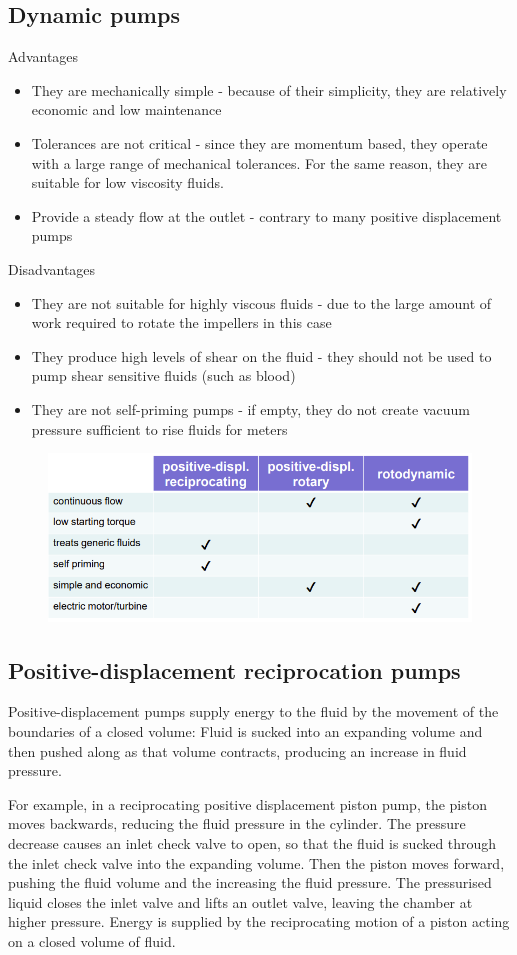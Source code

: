\documentclass[class=report, crop=false, 12pt,a4paper]{standalone}
\begin{document}
\subsection{Dynamic pumps}
Advantages
\begin{itemize}
  \item They are mechanically simple - because of their simplicity, they are relatively economic and low maintenance
  \item Tolerances are not critical - since they are momentum based, they operate with a large range of mechanical tolerances. For the same reason, they are suitable for low viscosity fluids. 
  \item Provide a steady flow at the outlet - contrary to many positive displacement pumps
\end{itemize}
Disadvantages
\begin{itemize}
  \item They are not suitable for highly viscous fluids - due to the large amount of work required to rotate the impellers in this case
  \item They produce high levels of shear on the fluid - they should not be used to pump shear sensitive fluids (such as blood)
  \item They are not self-priming pumps - if empty, they do not create vacuum pressure sufficient to rise fluids for meters
\end{itemize}
\begin{figure}[H]
  \centering
  \includegraphics[width = 0.8 \textwidth]{../img/tabletocomparepumps.png}
\end{figure}
\subsection{Positive-displacement reciprocation pumps}
Positive-displacement pumps supply energy to the fluid by the movement of the boundaries of a closed volume: Fluid is sucked into an expanding volume and then pushed along as that volume contracts, producing an increase in fluid pressure.

For example, in a reciprocating positive displacement piston pump, the piston moves backwards, reducing the fluid pressure in the cylinder. The pressure decrease causes an inlet check valve to open, so that the fluid is sucked through the inlet check valve into the expanding volume. Then the piston moves forward, pushing the fluid volume and the increasing the fluid pressure. The pressurised liquid closes the inlet valve and lifts an outlet valve, leaving the chamber at higher pressure. Energy is supplied by the reciprocating motion of a piston acting on a closed volume of fluid.
\end{document}
